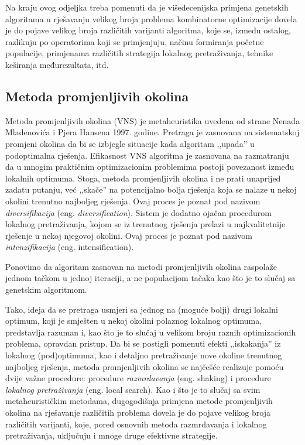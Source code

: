 \documentclass[b5paper, utf8, 11pt, colorlinks]{book}
\theoremstyle{definition}
\begin{document}
Na kraju ovog odjeljka treba pomenuti da je višedecenijska primjena genetskih algoritama u rješavanju velikog broja problema kombinatorne optimizacije dovela je do pojave velikog broja različitih varijanti algoritma, koje se, između ostalog, razlikuju po operatorima koji se primjenjuju, načinu formiranja početne populacije, primjenama različitih strategija lokalnog pretraživanja, tehnike keširanja međurezultata, itd. 



  
\subsection{Metoda promjenljivih okolina}\label{intro:vns}
  
Metoda promjenljivih okolina (VNS) je metaheuristika uvedena od strane Nenada Mladenovića i Pjera Hansena 1997. godine.
Pretraga je zasnovana na sistematskoj promjeni okolina da bi se izbjegle situacije kada algoritam ,,upada'' u podoptimalna rješenja. Efikasnost VNS algoritma je zasnovana na razmatranju da u mnogim praktičnim optimizacionim problemima postoji povezanost između lokalnih optimuma. Stoga, metoda promjenljivih okolina i ne prati unaprijed zadatu putanju, već ,,skače'' na potencijalno bolja rješenja koja se nalaze u nekoj okolini trenutno najboljeg rješenja. Ovaj proces je poznat pod nazivom \textit{diversifikacija} (eng. \emph {diversification}). Sistem je dodatno ojačan procedurom lokalnog pretraživanja, kojom se  iz trenutnog rješenja prelazi u najkvalitetnije rješenje u nekoj njegovoj okolini. Ovaj proces je poznat pod nazivom \textit{intenzifikacija} (eng.  {intensification}).

Ponovimo da algoritam zasnovan na metodi promjenljivih okolina raspolaže jednom tačkom u jednoj iteraciji, a ne populacijom tačaka kao što je to slučaj sa genetskim algoritmom.

Tako, ideja da se pretraga usmjeri sa jednog na (moguće bolji) drugi lokalni optimum, koji je smješten u nekoj okolini polaznog lokalnog optimuma, predstavlja razuman  i, kao što je to slučaj u velikom broju raznih optimizacionih problema, opravdan pristup.
Da bi se postigli pomenuti efekti ,,iskakanja'' iz lokalnog (pod)optimuma, kao i detaljno pretraživanje nove okoline trenutnog najboljeg rješenja, metoda promjenljivih okolina se najčešće realizuje pomoću dvije važne procedure: procedure \textit{razmrdavanja} (eng.  {shaking}) i procedure \textit{lokalnog pretraživanja} (eng.  {local search}). Kao i što je to slučaj sa svim metaheurističkim metodama, dugogodišnja primjena metode promjenljivih okolina na rješavanje različitih problema dovela je do pojave velikog broja različitih varijanti, koje, pored osnovnih metoda razmrdavanja i lokalnog pretraživanja, uključuju i mnoge druge efektivne strategije.
\end{document}
